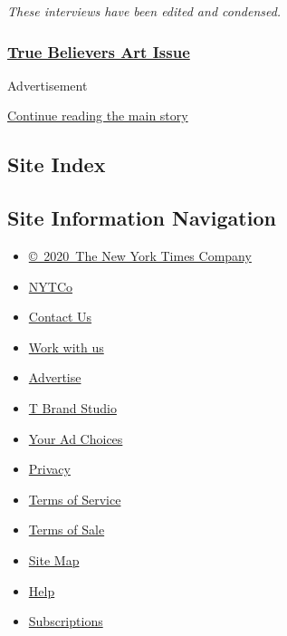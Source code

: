 \emph{These interviews have been edited and condensed.}

\hypertarget{true-believers-art-issue}{%
\subsubsection{\texorpdfstring{\href{https://www.nytimes.com/issue/t-magazine/2020/07/02/true-believers-art-issue}{True
Believers Art
Issue}}{True Believers Art Issue}}\label{true-believers-art-issue}}

Advertisement

\protect\hyperlink{after-bottom}{Continue reading the main story}

\hypertarget{site-index}{%
\subsection{Site Index}\label{site-index}}

\hypertarget{site-information-navigation}{%
\subsection{Site Information
Navigation}\label{site-information-navigation}}

\begin{itemize}
\tightlist
\item
  \href{https://help.nytimes.com/hc/en-us/articles/115014792127-Copyright-notice}{©~2020~The
  New York Times Company}
\end{itemize}

\begin{itemize}
\tightlist
\item
  \href{https://www.nytco.com/}{NYTCo}
\item
  \href{https://help.nytimes.com/hc/en-us/articles/115015385887-Contact-Us}{Contact
  Us}
\item
  \href{https://www.nytco.com/careers/}{Work with us}
\item
  \href{https://nytmediakit.com/}{Advertise}
\item
  \href{http://www.tbrandstudio.com/}{T Brand Studio}
\item
  \href{https://www.nytimes.com/privacy/cookie-policy\#how-do-i-manage-trackers}{Your
  Ad Choices}
\item
  \href{https://www.nytimes.com/privacy}{Privacy}
\item
  \href{https://help.nytimes.com/hc/en-us/articles/115014893428-Terms-of-service}{Terms
  of Service}
\item
  \href{https://help.nytimes.com/hc/en-us/articles/115014893968-Terms-of-sale}{Terms
  of Sale}
\item
  \href{https://spiderbites.nytimes.com}{Site Map}
\item
  \href{https://help.nytimes.com/hc/en-us}{Help}
\item
  \href{https://www.nytimes.com/subscription?campaignId=37WXW}{Subscriptions}
\end{itemize}

